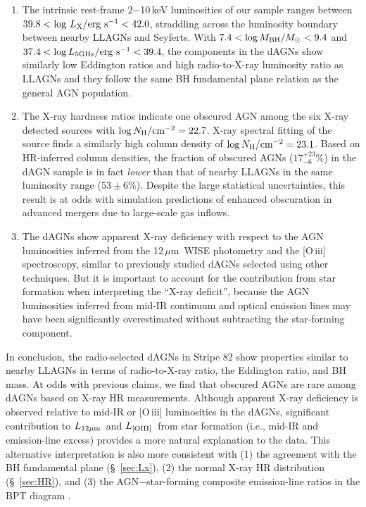 \documentclass[iop,revtex4,twocolumn,apj,numberedappendix,appendixfloats]{emulateapj}
\newcommand{\um}{$\mu$m}
\newcommand{\lmir}{$L_{\rm 12\mu m}$}
\newcommand{\loiii}{$L_{\rm [OIII]}$}
\begin{document}
\begin{enumerate}

\item The intrinsic rest-frame 2$-$10\,keV luminosities of our sample ranges between $39.8 < \log\,L_{\rm X}/{\rm erg~s}^{-1} < 42.0$, straddling across the luminosity boundary between nearby LLAGNs and Seyferts. With $7.4 < \log M_{\rm BH}/M_\odot < 9.4$ and $37.4 < \log L_{\rm 5 GHz}/{\rm erg~s}^{-1} < 39.4$, the components in the dAGNs show similarly low Eddington ratios and high radio-to-X-ray luminosity ratio as LLAGNs and they follow the same BH fundamental plane relation as the general AGN population. 

\item The X-ray hardness ratios indicate one obscured AGN among the six X-ray detected sources with $\log N_{\rm H}/{\rm cm}^{-2} = 22.7$. X-ray spectral fitting of the source finds a similarly high column density of $\log N_{\rm H}/{\rm cm}^{-2} = 23.1$. Based on HR-inferred column densities, the fraction of obscured AGNs ($17^{+23}_{-6}$\%) in the dAGN sample is in fact {\it lower} than that of nearby LLAGNs in the same luminosity range ($53\pm6$\%). Despite the large statistical uncertainties, this result is at odds with simulation predictions of enhanced obscuration in advanced mergers due to large-scale gas inflows.

\item The dAGNs show apparent X-ray deficiency with respect to the AGN luminosities inferred from the 12\,\um\ WISE photometry and the [O\,{\sc iii}] spectroscopy, similar to previously studied dAGNs selected using other techniques. But it is important to account for the contribution from star formation when interpreting the ``X-ray deficit'', because the AGN luminosities inferred from mid-IR continuum and optical emission lines may have been significantly overestimated without subtracting the star-forming component. 

\end{enumerate}

In conclusion, the radio-selected dAGNs in Stripe 82 show properties similar to nearby LLAGNs in terms of radio-to-X-ray ratio, the Eddington ratio, and BH mass. At odds with previous claims, we find that obscured AGNs are rare among dAGNs based on X-ray HR measurements. Although apparent X-ray deficiency is observed relative to mid-IR or [O\,{\sc iii}] luminosities in the dAGNs, significant contribution to \lmir\ and \loiii\ from star formation (i.e., mid-IR and emission-line excess) provides a more natural explanation to the data. This alternative interpretation is also more consistent with (1) the agreement with the BH fundamental plane (\S~\ref{sec:Lx}), (2) the normal X-ray HR distribution (\S~\ref{sec:HR}), and (3) the AGN$-$star-forming composite emission-line ratios in the BPT diagram .
\end{document}
